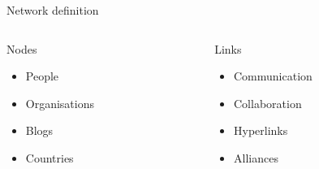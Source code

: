 \documentclass[hide notes,compress]{beamer}
\begin{document}
\begin{frame}[c]{Network definition}

  \begin{columns}
    \begin{column}{.47\textwidth}
      \begin{block}{Nodes}
        \begin{itemize}
          \item People
          \item Organisations
          \item Blogs
          \item Countries
        \end{itemize}
      \end{block}
    \end{column}
    \begin{column}{.47\textwidth}
      \begin{block}{Links}
        \begin{itemize}
          \item Communication
          \item Collaboration
          \item Hyperlinks
          \item Alliances
        \end{itemize}
      \end{block}
    \end{column}
  \end{columns}
  
\end{frame}
\end{document}
